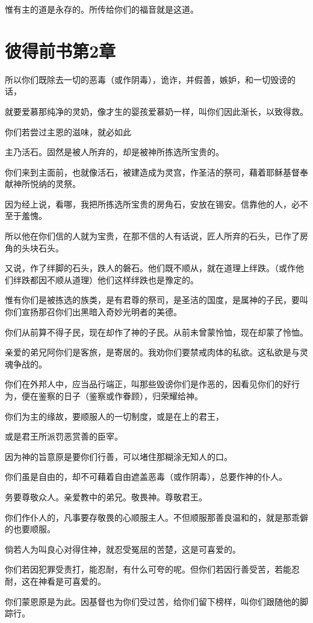 \documentclass[12pt,oneside]{book}
\begin{document}
惟有主的道是永存的。所传给你们的福音就是这道。

\chapter{彼得前书第2章}
所以你们既除去一切的恶毒（或作阴毒），诡诈，并假善，嫉妒，和一切毁谤的话，

就要爱慕那纯净的灵奶，像才生的婴孩爱慕奶一样，叫你们因此渐长，以致得救。

你们若尝过主恩的滋味，就必如此

主乃活石。固然是被人所弃的，却是被神所拣选所宝贵的。

你们来到主面前，也就像活石，被建造成为灵宫，作圣洁的祭司，藉着耶稣基督奉献神所悦纳的灵祭。

因为经上说，看哪，我把所拣选所宝贵的房角石，安放在锡安。信靠他的人，必不至于羞愧。

所以他在你们信的人就为宝贵，在那不信的人有话说，匠人所弃的石头，已作了房角的头块石头。

又说，作了绊脚的石头，跌人的磐石。他们既不顺从，就在道理上绊跌。（或作他们绊跌都因不顺从道理）他们这样绊跌也是豫定的。

惟有你们是被拣选的族类，是有君尊的祭司，是圣洁的国度，是属神的子民，要叫你们宣扬那召你们出黑暗入奇妙光明者的美德。

你们从前算不得子民，现在却作了神的子民。从前未曾蒙怜恤，现在却蒙了怜恤。

亲爱的弟兄阿你们是客旅，是寄居的。我劝你们要禁戒肉体的私欲。这私欲是与灵魂争战的。

你们在外邦人中，应当品行端正，叫那些毁谤你们是作恶的，因看见你们的好行为，便在鉴察的日子（鉴察或作眷顾），归荣耀给神。

你们为主的缘故，要顺服人的一切制度，或是在上的君王，

或是君王所派罚恶赏善的臣宰。

因为神的旨意原是要你们行善，可以堵住那糊涂无知人的口。

你们虽是自由的，却不可藉着自由遮盖恶毒（或作阴毒），总要作神的仆人。

务要尊敬众人。亲爱教中的弟兄。敬畏神。尊敬君王。

你们作仆人的，凡事要存敬畏的心顺服主人。不但顺服那善良温和的，就是那乖僻的也要顺服。

倘若人为叫良心对得住神，就忍受冤屈的苦楚，这是可喜爱的。

你们若因犯罪受责打，能忍耐，有什么可夸的呢。但你们若因行善受苦，若能忍耐，这在神看是可喜爱的。

你们蒙恩原是为此。因基督也为你们受过苦，给你们留下榜样，叫你们跟随他的脚踪行。
\end{document}
